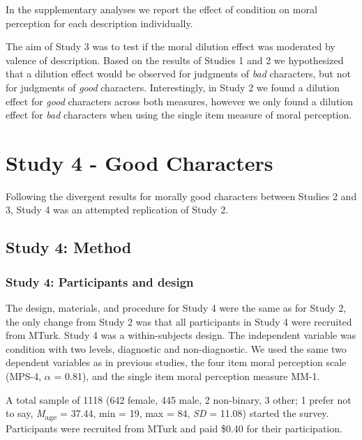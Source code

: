 \documentclass[
  english,
  man,floatsintext]{apa7}
\begin{document}
In the supplementary analyses we report the effect of condition on moral perception for each description individually.

The aim of Study 3 was to test if the moral dilution effect was moderated by valence of description. Based on the results of Studies 1 and 2 we hypothesized that a dilution effect would be observed for judgments of \emph{bad} characters, but not for judgments of \emph{good} characters. Interestingly, in Study 2 we found a dilution effect for \emph{good} characters across both measures, however we only found a dilution effect for \emph{bad} characters when using the single item measure of moral perception.

\hypertarget{study-4---good-characters}{%
\section{Study 4 - Good Characters}\label{study-4---good-characters}}

Following the divergent results for morally good characters between Studies 2 and 3, Study 4 was an attempted replication of Study 2.

\hypertarget{study-4-method}{%
\subsection{Study 4: Method}\label{study-4-method}}

\hypertarget{study-4-participants-and-design}{%
\subsubsection{Study 4: Participants and design}\label{study-4-participants-and-design}}

The design, materials, and procedure for Study 4 were the same as for Study 2, the only change from Study 2 was that all participants in Study 4 were recruited from MTurk. Study 4 was a within-subjects design. The independent variable was condition with two levels, diagnostic and non-diagnostic. We used the same two dependent variables as in previous studies, the four item moral perception scale (MPS-4, \(\alpha\) = 0.81), and the single item moral perception measure MM-1.

A total sample of 1118 (642 female, 445 male, 2 non-binary, 3 other; 1 prefer not to say, \emph{M}\textsubscript{age} = 37.44, min = 19, max = 84, \emph{SD} = 11.08) started the survey. Participants were recruited from MTurk and paid \$0.40 for their participation.
\end{document}
